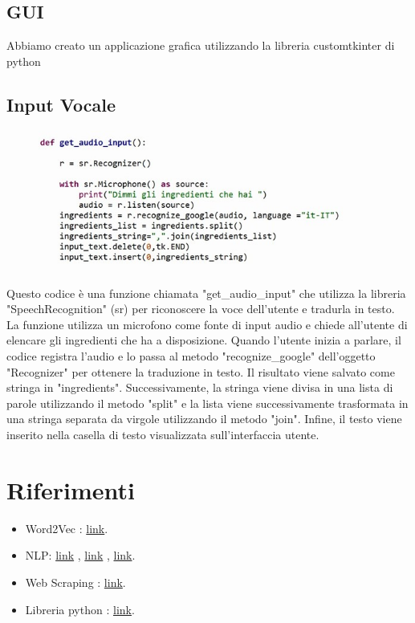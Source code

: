 \documentclass[12pt]{report}
\begin{document}
\section{GUI}
 Abbiamo creato un applicazione grafica utilizzando la libreria customtkinter di python
\section{Input Vocale}   
\begin{figure}[H]
        \centering
        {\includegraphics[width=0.9\textwidth]{img/img20.jpg}}
\end{figure}

Questo codice è una funzione chiamata "get\_audio\_input" che utilizza la libreria "SpeechRecognition" (sr) per riconoscere la voce dell'utente e tradurla in testo. La funzione utilizza un microfono come fonte di input audio e chiede all'utente di elencare gli ingredienti che ha a disposizione. Quando l'utente inizia a parlare, il codice registra l'audio e lo passa al metodo "recognize\_google" dell'oggetto "Recognizer" per ottenere la traduzione in testo. Il risultato viene salvato come stringa in "ingredients". Successivamente, la stringa viene divisa in una lista di parole utilizzando il metodo "split" e la lista viene successivamente trasformata in una stringa separata da virgole utilizzando il metodo "join". Infine, il testo viene inserito nella casella di testo visualizzata sull'interfaccia utente.

\chapter{Riferimenti}
\begin{itemize}
\item Word2Vec  : \href{http://nadbordrozd.github.io/blog/2016/05/20/text-classification-with-word2vec/}{link}.
\item NLP: \href{https://towardsdatascience.com/nlp-performance-of-different-word-embeddings-on-text-classification-de648c6262b}{link} , \href{https://github.com/TomLin/Playground/blob/master/04-Model-Comparison-Word2vec-Doc2vec-TfIdfWeighted.ipynb}{link} , 
\href{https://towardsdatascience.com/an-introduction-to-word2vec-in-nlp-854e1c288894}{link}.
\item Web Scraping : \href{https://realpython.com/beautiful-soup-web-scraper-python/}{link}.
\item Libreria python : \href{ https://github.com/hhursev/recipe-scrapers}{link}.
\end{itemize}
\end{document}
